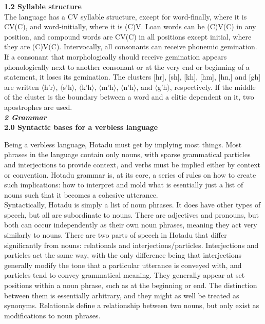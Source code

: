 \documentclass{article}[10pt]
\begin{document}
{\bf 1.2 Syllable structure}\\

The language has a CV syllable structure, except for word-finally, where it is CV(C), and word-initially, where it is (C)V. Loan words can be (C)V(C) in any position, and compound words are CV(C) in all positions except initial, where they are (C)V(C). Intervocally, all consonants can receive phonemic gemination. If a consonant that morphologically should receive gemination appears phonologically next to another consonant or at the very end or beginning of a statement, it loses its gemination. The clusters [hr], [sh], [kh], [hm], [hn,] and [gh] are written $\langle$h'r$\rangle$,  $\langle$s'h$\rangle$, $\langle$k'h$\rangle$, $\langle$m'h$\rangle$, $\langle$n'h$\rangle$, and $\langle$g'h$\rangle$, respectively. If the middle of the cluster is the boundary between a word and a clitic dependent on it, two apostrophes are used.\\

\clearpage
{\bf \emph{2 Grammar}}\\

{\bf 2.0 Syntactic bases for a verbless language}

Being a verbless language, Hotadu must get by implying most things. Most phrases in the language contain only nouns, with sparse grammatical particles and interjections to provide context, and verbs must be implied either by context or convention. Hotadu grammar is, at its core, a series of rules on how to create such implications: how to interpret and mold what is esentially just a list of nouns such that it becomes a cohesive utterance.\\

Syntactically, Hotadu is simply a list of noun phrases. It does have other types of speech, but all are subordinate to nouns. There are adjectives and pronouns, but both can occur independently as their own noun phrases, meaning they act very similarly to nouns. There are two parts of speech in Hotadu that differ significantly from nouns: relationals and interjections/particles. Interjections and particles act the same way, with the only difference being that interjections generally modify the tone that a particular utterance is conveyed with, and particles tend to convey grammatical meaning. They generally appear at set positions within a noun phrase, such as at the beginning or end. The distinction between them is essentially arbitrary, and they might as well be treated as synonyms. Relationals define a relationship between two nouns, but only exist as modifications to noun phrases.\\
\end{document}
